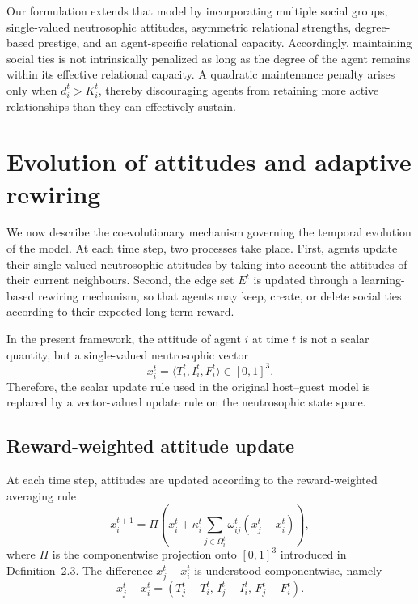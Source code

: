 \documentclass[11pt,a4paper]{article}
\begin{document}
	Our formulation extends that model by incorporating multiple social groups, single-valued neutrosophic attitudes, asymmetric relational strengths, degree-based prestige, and an agent-specific relational capacity. Accordingly, maintaining social ties is not intrinsically penalized as long as the degree of the agent remains within its effective relational capacity. A quadratic maintenance penalty arises only when $d_i^t>K_i^t$, thereby discouraging agents from retaining more active relationships than they can effectively sustain.
	
\section{Evolution of attitudes and adaptive rewiring}

We now describe the coevolutionary mechanism governing the temporal evolution of
the model. At each time step, two processes take place. First, agents update their
single-valued neutrosophic attitudes by taking into account the attitudes of their
current neighbours. Second, the edge set $E^t$ is updated through a learning-based
rewiring mechanism, so that agents may keep, create, or delete social ties according
to their expected long-term reward.

In the present framework, the attitude of agent $i$ at time $t$ is not a scalar
quantity, but a single-valued neutrosophic vector
\[
x_i^t=\langle T_i^t,I_i^t,F_i^t\rangle\in[0,1]^3.
\]
Therefore, the scalar update rule used in the original host--guest model is replaced
by a vector-valued update rule on the neutrosophic state space.

\subsection{Reward-weighted attitude update}

At each time step, attitudes are updated according to the reward-weighted averaging
rule
\[
x_i^{t+1}
=
\Pi\left(
x_i^t
+
\kappa_i^t
\sum_{j\in\Omega_i^t}
\omega_{ij}^t
\left(x_j^t-x_i^t\right)
\right),
\tag{A1}
\]
where $\Pi$ is the componentwise projection onto $[0,1]^3$ introduced in
Definition~2.3. The difference $x_j^t-x_i^t$ is understood componentwise, namely
\[
x_j^t-x_i^t
=
\left(
T_j^t-T_i^t,\,
I_j^t-I_i^t,\,
F_j^t-F_i^t
\right).
\]
\end{document}
